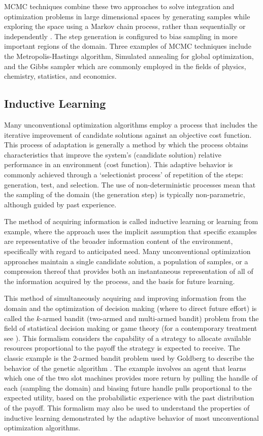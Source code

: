 MCMC techniques combine these two approaches to solve integration and optimization problems in large dimensional spaces by generating samples while exploring the space using a Markov chain process, rather than sequentially or independently \cite{Andrieu2003}. The step generation is configured to bias sampling in more important regions of the domain. Three examples of MCMC techniques include the Metropolis-Hastings algorithm, Simulated annealing for global optimization, and the Gibbs sampler which are commonly employed in the fields of physics, chemistry, statistics, and economics. 

% 
% 
\subsection{Inductive Learning}
\label{subsec:induction}
Many unconventional optimization algorithms employ a process that includes the iterative improvement of candidate solutions against an objective cost function. This process of adaptation is generally a method by which the process obtains characteristics that improve the system's (candidate solution) relative performance in an environment (cost function). This adaptive behavior is commonly achieved through a `selectionist process' of repetition of the steps: generation, test, and selection. The use of non-deterministic processes mean that the sampling of the domain (the generation step) is typically non-parametric, although guided by past experience. 

The method of acquiring information is called inductive learning or learning from example, where the approach uses the implicit assumption that specific examples are representative of the broader information content of the environment, specifically with regard to anticipated need. Many unconventional optimization approaches maintain a single candidate solution, a population of samples, or a compression thereof that provides both an instantaneous representation of all of the information acquired by the process, and the basis for future learning. 

This method of simultaneously acquiring and improving information from the domain and the optimization of decision making (where to direct future effort) is called the $k$-armed bandit (two-armed and multi-armed bandit) problem from the field of statistical decision making or game theory \cite{Robbins1952} (for a contemporary treatment see \cite{Bergemann2006}). This formalism considers the capability of a strategy to allocate available resources proportional to the payoff the strategy is expected to receive. The classic example is the 2-armed bandit problem used by Goldberg to describe the behavior of the genetic algorithm \cite{Goldberg1989}. The example involves an agent that learns which one of the two slot machines provides more return by pulling the handle of each (sampling the domain) and biasing future handle pulls proportional to the expected utility, based on the probabilistic experience with the past distribution of the payoff. This formalism may also be used to understand the properties of inductive learning demonstrated by the adaptive behavior of most unconventional optimization algorithms.

